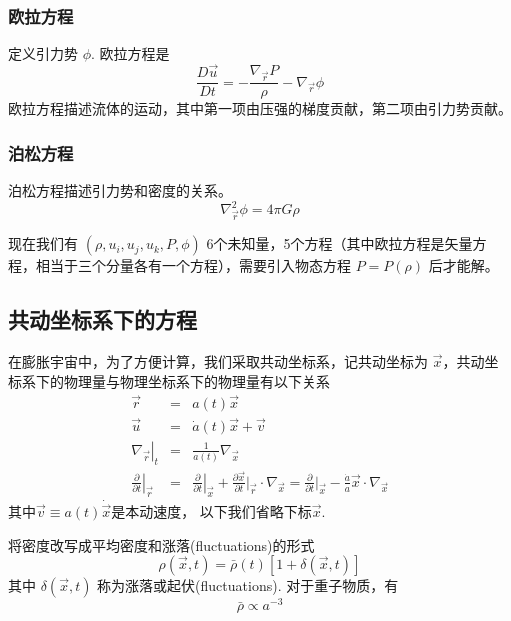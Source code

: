 \documentclass[12pt]{ctexart}
\begin{document}
\subsubsection*{欧拉方程}

定义引力势 $\phi$. 欧拉方程是
\begin{equation}
    \frac{D \vec{u}}{D t} = -\frac{\nabla_{\vec{r}} P}{\rho} - \nabla_{\vec{r}} \phi
\end{equation}
欧拉方程描述流体的运动，其中第一项由压强的梯度贡献，第二项由引力势贡献。

\subsubsection*{泊松方程}

泊松方程描述引力势和密度的关系。
\begin{equation} \label{eq:Poisson}
    \nabla_{\vec{r}}^2 \phi = 4\pi G \rho
\end{equation}

现在我们有 $\left(\rho, u_{i}, u_{j}, u_{k}, P, \phi\right)$ 6个未知量，5个方程（其中欧拉方程是矢量方程，相当于三个分量各有一个方程），需要引入物态方程 $P=P\left(\rho\right)$ 后才能解。

\subsection{共动坐标系下的方程}
在膨胀宇宙中，为了方便计算，我们采取共动坐标系，记共动坐标为 $\vec{x}$，共动坐标系下的物理量与物理坐标系下的物理量有以下关系
\begin{eqnarray}
    \vec{r} &=& a(t) \vec{x} \label{eq:como_r}\\ 
    \vec{u} &=& \dot{a}(t) \vec{x} + \vec{v} \\ 
    \left.\nabla_{\vec{r}}\right|_t &=& \frac{1}{a(t)} \nabla_{\vec{x}} \\ 
    \left. \frac{\partial}{\partial t} \right|_{\vec{r}} &=& \left. \frac{\partial}{\partial t} \right|_{\vec{x}} + \frac{\partial \vec{x}}{\partial t} \bigg|_{\vec{r}} \cdot \nabla_{\vec{x}} = \frac{\partial}{\partial t} \bigg|_{\vec{x}} - \frac{\dot{a}}{a} \vec{x} \cdot \nabla_{\vec{x}}
\end{eqnarray}
其中$\vec{v} \equiv a(t) \dot{\vec{x}}$是本动速度，
以下我们省略下标$\vec{x}$.

将密度改写成平均密度和涨落(fluctuations)的形式
\begin{equation}
    \rho \left(\vec{x},t\right) = \bar{\rho}\left(t\right)  \left[1+\delta \left(\vec{x}, t\right) \right] 
\end{equation}
其中 $\delta \left(\vec{x}, t\right)$ 称为涨落或起伏(fluctuations).
对于重子物质，有 
\begin{equation} \label{eq:a-3}
    \bar{\rho}\propto a^{-3}
\end{equation}
\end{document}
